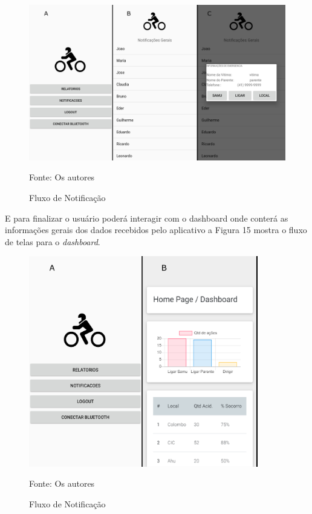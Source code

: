 \begin{figure}[H]

 \caption{Fluxo de Notificação}
\begin{center}
  \includegraphics[width=150mm]{images/Cap3/sequencia_notificacao.png}
    \end{center}
     Fonte: Os autores
\end{figure}


E para finalizar o usuário poderá interagir com o dashboard onde conterá as informações gerais dos dados recebidos pelo aplicativo a Figura 15 mostra o fluxo de telas para o \textit{dashboard}.

\begin{figure}[H]

 \caption{Fluxo de Notificação}
\begin{center}
  \includegraphics[width=100mm]{images/Cap3/Sequencia_dash.png}
    \end{center}
     Fonte: Os autores
\end{figure}



